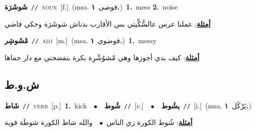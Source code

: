 \documentclass[10pt,a4paper,twoside]{article} %
\begin{document}
\begin{multicols}{2}
{\setlength\topsep{0pt}\textbf{\foreignlanguage{arabic}{شَوشَرَة}}\ {\color{gray}\texttt{//}\color{black}}\ \textsc{noun}\ [f.]\ \color{gray}(msa. \foreignlanguage{arabic}{فوضى}~\foreignlanguage{arabic}{\textbf{١.}})\color{black}\ \textbf{1.}~mess  \textbf{2.}~noise\  \begin{flushright}\color{gray}\foreignlanguage{arabic}{\textbf{\underline{\foreignlanguage{arabic}{أمثلة}}}: عملنا عرس عالسُّكِّيتي بس الأقارب بدناش شوشَرَة وحكي فاضي}\end{flushright}\color{black}} \vspace{2mm}

{\setlength\topsep{0pt}\textbf{\foreignlanguage{arabic}{مْشَوشِر}}\ {\color{gray}\texttt{//}\color{black}}\ \textsc{adj}\ [m.]\ \color{gray}(msa. \foreignlanguage{arabic}{فوضوي}~\foreignlanguage{arabic}{\textbf{١.}})\color{black}\ \textbf{1.}~messy\  \begin{flushright}\color{gray}\foreignlanguage{arabic}{\textbf{\underline{\foreignlanguage{arabic}{أمثلة}}}: كيف بدي أجوزها وهي مْشوُشْرِة بكرة بتفضحني مع دار حماها}\end{flushright}\color{black}} \vspace{2mm}

\vspace{-3mm}
\subsection*{\color{blue}\foreignlanguage{arabic}{ش.و.ط}\color{blue}{}} 

{\setlength\topsep{0pt}\textbf{\foreignlanguage{arabic}{شَاط}}\ {\color{gray}\texttt{//}\color{black}}\ \textsc{verb}\ [p.]\ \textbf{1.}~kick\ \ $\bullet$\ \ \setlength\topsep{0pt}\textbf{\foreignlanguage{arabic}{شُوط}}\ {\color{gray}\texttt{//}\color{black}}\ [c.]\ \ $\bullet$\ \ \setlength\topsep{0pt}\textbf{\foreignlanguage{arabic}{يشُوط}}\ {\color{gray}\texttt{//}\color{black}}\ [i.]\ \color{gray}(msa. \foreignlanguage{arabic}{يَرْكُل}~\foreignlanguage{arabic}{\textbf{١.}})\color{black}\  \begin{flushright}\color{gray}\foreignlanguage{arabic}{\textbf{\underline{\foreignlanguage{arabic}{أمثلة}}}: شُوط الكورة زي الناس\ $\bullet$\ \  والله شاط الكورة شوطَة قوية}\end{flushright}\color{black}} \vspace{2mm}


\end{multicols}
\end{document}
